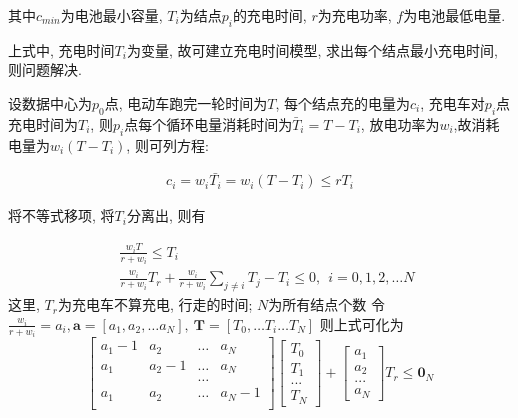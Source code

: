 其中$c_{min}$为电池最小容量, $T_i$为结点$p_i$的充电时间, $r$为充电功率, $f$为电池最低电量.

上式中, 充电时间$T_i$为变量, 故可建立充电时间模型, 求出每个结点最小充电时间, 则问题解决.

设数据中心为$p_0$点, 电动车跑完一轮时间为$T$, 每个结点充的电量为$c_i$, 充电车对$p_i$点充电时间为$T_i$, 则$p_i$点每个循环电量消耗时间为$\bar{T}_i = T-T_i$, 放电功率为$w_i$,故消耗电量为$w_i(T-T_i)$, 则可列方程:

\begin{eqnarray}
c_i = w_i \bar{T_i} = w_i(T-T_i)\leq rT_i 
\end{eqnarray}

将不等式移项, 将$T_i$分离出, 则有

\begin{eqnarray}
\nonumber
\quad &\frac{w_iT}{r+w_i} \leq T_i&\\
\nonumber
\quad &\frac{w_i}{r+w_i} T_{r} + \frac{w_i}{r+w_i} \sum\limits_{j\neq i } T_j - T_i \leq 0,~~ i =0,1,2,\dots N&
\end{eqnarray}
这里, $T_r$为充电车不算充电, 行走的时间; $N$为所有结点个数
令$\frac{w_i}{r+w_i} = a_i, \textbf{a} = [a_1, a_2, \dots a_N], ~\textbf{T} = [T_0,\dots T_i \dots T_N]$
则上式可化为
\begin{equation}       %
    \left[                 %
      \begin{array}{cccc}   %
        a_1-1 & a_2 & \dots& a_N \\  %
        a_1 & a_2 -1 & \dots& a_N \\  %
        &&\dots&\\
        a_1&a_2&\dots&a_N-1\\
      \end{array}
    \right]                 %
    \left[
        \begin{array}{cccc}
         T_0\\
         T_1\\
         ... \\
         T_{N}
        \end{array}
    \right ]
    +
    \left[
    \begin{array}{cccc}
     a_{1}\\
     a_{2}\\
     ... \\
     a_{N}
    \end{array}
    \right ]
    T_r \leq \textbf{0}_N
    \end{equation}

